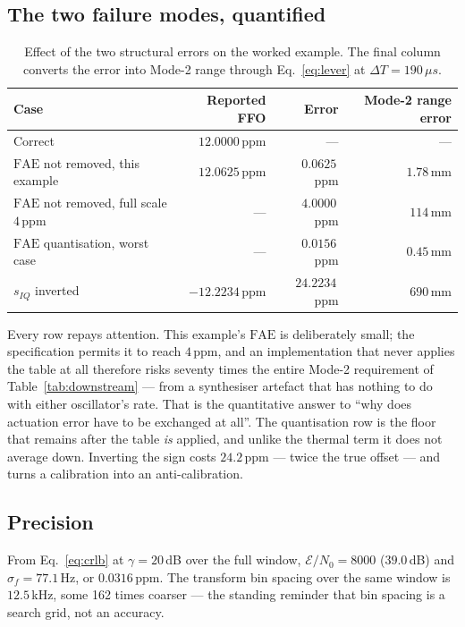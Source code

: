 \documentclass[11pt,a4paper]{article}
\newcommand{\us}{\,\ensuremath{\upmu}s}
\newcommand{\FAE}{\mathrm{FAE}}
\providecommand{\upmu}{\mu}
\begin{document}
\subsection{The two failure modes, quantified}

\begin{table}[h]
\caption{Effect of the two structural errors on the worked example. The final column converts the
error into Mode-2 range through Eq.~\eqref{eq:lever} at $\Delta T = 190\us$.}
\label{tab:failures}
\centering\small
\begin{tabular}{@{}L{46mm}rrr@{}}
\toprule
Case & Reported FFO & Error & Mode-2 range error \\
\midrule
Correct                                   & $12.0000$\,ppm  & ---              & --- \\
$\FAE$ not removed, this example           & $12.0625$\,ppm  & $0.0625$\,ppm    & $1.78$\,mm \\
$\FAE$ not removed, full scale $4$\,ppm    & ---             & $4.0000$\,ppm    & $114$\,mm \\
$\FAE$ quantisation, worst case            & ---             & $0.0156$\,ppm    & $0.45$\,mm \\
$s_{IQ}$ inverted                         & $-12.2234$\,ppm & $24.2234$\,ppm   & $690$\,mm \\
\bottomrule
\end{tabular}
\end{table}

Every row repays attention. This example's $\FAE$ is deliberately small; the specification permits it
to reach $4$\,ppm, and an implementation that never applies the table at all therefore risks
seventy times the entire Mode-2 requirement of Table~\ref{tab:downstream} --- from a synthesiser
artefact that has nothing to do with either oscillator's rate. That is the quantitative answer to
``why does actuation error have to be exchanged at all''. The quantisation row is the floor that
remains after the table \emph{is} applied, and unlike the thermal term it does not average down.
Inverting the sign costs $24.2$\,ppm --- twice the true offset --- and turns a calibration into an
anti-calibration.

\subsection{Precision}

From Eq.~\eqref{eq:crlb} at $\gamma=20$\,dB over the full window, $\mathcal{E}/N_0 = 8000$
($39.0$\,dB) and $\sigma_f = 77.1$\,Hz, or $0.0316$\,ppm. The transform bin spacing over the same
window is $12.5$\,kHz, some 162 times coarser --- the standing reminder that bin spacing is a search
grid, not an accuracy.
\end{document}
